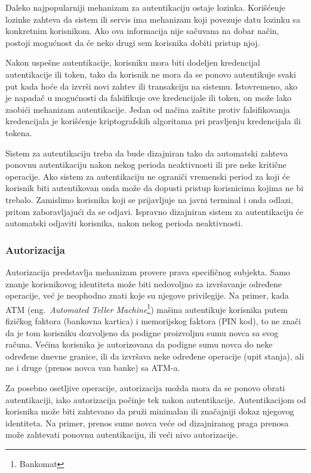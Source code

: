 \documentclass[a4paper]{article}
\begin{document}
Daleko najpopularniji mehanizam za autentikaciju ostaje lozinka. Korišćenje lozinke zahteva da sistem ili servis 
ima mehanizam koji povezuje datu lozinku sa konkretnim korisnikom. Ako ova informacija nije sačuvana na dobar 
način, postoji mogućnost da će neko drugi sem korisnika dobiti pristup njoj.

Nakon uspešne autentikacije, korisniku mora biti 
dodeljen kredencijal autentikacije ili token, tako da korisnik 
ne mora da se ponovo autentikuje svaki put kada hoće da izvrši novi zahtev ili transakciju na sistemu. 
Istovremeno, ako je napadač u mogućnosti da falsifikuje ove kredencijale ili token, on može lako zaobići 
mehanizam autentikacije. Jedan od načina zaštite protiv falsifikovanja kredencijala je korišćenje 
kriptografskih algoritama pri pravljenju kredencijala ili tokena.\cite{Top10}

Sistem za autentikaciju treba da bude dizajniran tako da automatski zahteva ponovnu autentikaciju nakon nekog 
perioda neaktivnosti ili pre neke kritične operacije.
Ako sistem za autentikaciju ne ograniči vremenski period za koji će korisnik biti autentikovan onda može 
da dopusti pristup korisnicima kojima ne bi trebalo. Zamislimo korisnika koji se prijavljuje na javni terminal
i onda odlazi, pritom zaboravljajući da se odjavi. Ispravno dizajniran sistem za autentikaciju 
će automatski odjaviti korisnika, nakon nekog perioda neaktivnosti.

\subsubsection{Autorizacija}
Autorizacija predstavlja mehanizam provere prava specifičnog subjekta.
Samo znanje korisnikovog identiteta može biti nedovoljno za izvršavanje određene operacije, već je neophodno znati koje su njegove privilegije.
Na primer, kada ATM (eng.~{\em Automated Teller Machine}\footnote{Bankomat}) mašina autentikuje korisnika putem fizičkog faktora (bankovna kartica) i memorijskog faktora (PIN kod),
to ne znači da je tom korisniku dozvoljeno da podigne proizvoljnu sumu novca sa svog računa. Većina korisnika je autorizovana 
da podigne sumu novca do neke određene dnevne granice, ili da izvršava neke određene operacije (upit stanja), 
ali ne i druge (prenos novca van banke) sa ATM-a.
 
Za posebno osetljive operacije, autorizacija možda mora da se ponovo obrati autentikaciji, iako autorizacija počinje tek 
nakon autentikacije. Autentikacijom od korisnika može biti zahtevano da pruži minimalan ili značajniji dokaz njegovog identiteta. 
Na primer, prenos sume novca veće od dizajniranog praga prenosa može zahtevati ponovnu autentikaciju, ili veći nivo autorizacije.
\end{document}
